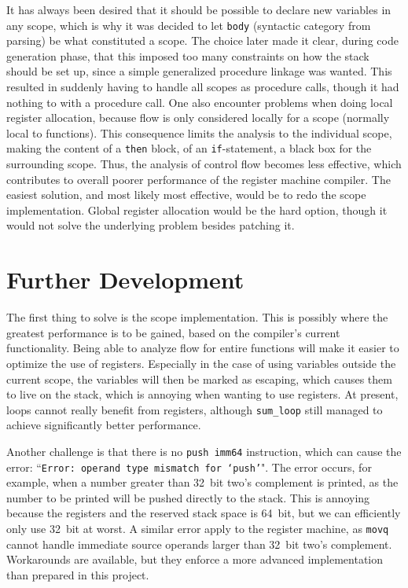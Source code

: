 It has always been desired that it should be possible to declare new variables in any scope, which is why it was decided to let \texttt{body} (syntactic category from parsing) be what constituted a scope. The choice later made it clear, during code generation phase, that this imposed too many constraints on how the stack should be set up, since a simple generalized procedure linkage was wanted. This resulted in suddenly having to handle all scopes as procedure calls, though it had nothing to with a procedure call. One also encounter problems when doing local register allocation, because flow is only considered locally for a scope (normally local to functions). This consequence limits the analysis to the individual scope, making the content of a \texttt{then} block, of an \texttt{if}-statement, a black box for the surrounding scope. Thus, the analysis of control flow becomes less effective, which contributes to overall poorer performance of the register machine compiler. The easiest solution, and most likely most effective, would be to redo the scope implementation. Global register allocation would be the hard option, though it would not solve the underlying problem besides patching it.

\section{Further Development}
The first thing to solve is the scope implementation. This is possibly where the greatest performance is to be gained, based on the compiler's current functionality. Being able to analyze flow for entire functions will make it easier to optimize the use of registers. Especially in the case of using variables outside the current scope, the variables will then be marked as escaping, which causes them to live on the stack, which is annoying when wanting to use registers. At present, loops cannot really benefit from registers, although \texttt{sum\_loop} still managed to achieve significantly better performance.

Another challenge is that there is no \texttt{push imm64} instruction, which can cause the error: ``\texttt{Error: operand type mismatch for `push'}". The error occurs, for example, when a number greater than \SI{32}{bit} two's complement is printed, as the number to be printed will be pushed directly to the stack. This is annoying because the registers and the reserved stack space is \SI{64}{bit}, but we can efficiently only use \SI{32}{bit} at worst. A similar error apply to the register machine, as \texttt{movq} cannot handle immediate source operands larger than \SI{32}{bit} two's complement. Workarounds are available, but they enforce a more advanced implementation than prepared in this project. 

